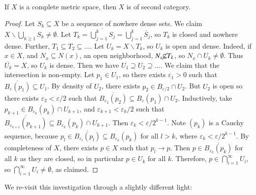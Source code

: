 \begin{namthm}
    If $X$ is a complete metric space, then $X$ is of second category.
\end{namthm}
\begin{proof}
    Let $S_k \subseteq X$ be a sequence of nowhere dense sets. We claim $X \backslash \bigcup_{k\geq 1}S_k \neq \emptyset$. Let $T_k = \overline{\bigcup_{j=1}^kS_j} = \bigcup_{j=1}^k\overline{S}_j$, so $T_k$ is closed and nowhere dense. Further, $T_1 \subseteq T_2 \subseteq ...$. Let $U_k = X\backslash T_k$, so $U_k$ is open and dense. Indeed, if $x \in X$, and $N_x \subseteq N(x)$, an open neighborhood, $N_x \cancel{\subseteq}T_k$, so $N_x\cap U_k \neq \emptyset$. Thus $\overline{U_k} = X$, so $U_k$ is dense. Then we have $U_1 \supseteq U_2 \supseteq ...$. We claim that the intersection is non-empty. Let $p_1 \in U_1$, so there exists $\varepsilon_1 > 0$ such that $\overline{B_{\varepsilon}(p_1)} \subseteq U_1$. By density of $U_2$, there exists $p_2 \in B_{\varepsilon/2}\cap U_2$. But $U_2$ is open so there exists $\varepsilon_2 < \varepsilon/2$ such that $\overline{B_{\varepsilon_2}(p_2)} \subseteq B_{\varepsilon}(p_1)\cap U_2$. Inductively, take $p_{k+1} \in B_{\varepsilon_k}(p_k) \cap U_{k+1}$, and $\varepsilon_{k+1} < \varepsilon_k/2$ such that $\overline{B_{\varepsilon_{k+1}}(p_{k+1})} \subseteq B_{\varepsilon_k}(p_k) \cap U_{k+1}$. Then $\varepsilon_k < \varepsilon/2^{k-1}$. Note $(p_k)$ is a Cauchy sequence, because $p_l \in \overline{B_{\varepsilon_l}(p_l)} \subseteq B_{\varepsilon_k}(p_k)$ for all $l > k$, where $\varepsilon_k < \varepsilon/2^{k-1}$. By completeness of $X$, there exists $p \in X$ such that $p_l \rightarrow p$. Then $p \in \overline{B_{\varepsilon_k}(p_k)}$ for all $k$ as they are closed, so in particular $p \in U_k$ for all $k$. Therefore, $p \in \bigcap_{i=1}^{\infty}U_i$, so $\bigcap_{i=1}^{\infty}U_i\neq \emptyset$, as claimed.
\end{proof}

We re-visit this investigation through a slightly different light:

